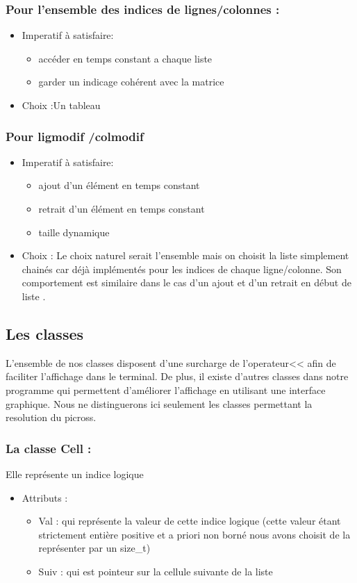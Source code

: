 \documentclass{article}
\begin{document}
\subsubsection{Pour l’ensemble des indices de lignes/colonnes :}
\begin{itemize}
\item Imperatif \`a satisfaire:
\begin{itemize}
\item acc\'eder en temps constant a chaque liste
\item garder un indicage coh\'erent avec la matrice
\end{itemize}
\item Choix :Un tableau
\end{itemize}
\subsubsection{Pour ligmodif /colmodif}
\begin{itemize}
\item Imperatif \`a satisfaire:
\begin{itemize}
\item ajout d’un \'el\'ement en temps constant
\item retrait d’un \'el\'ement en temps constant
\item taille dynamique
\end{itemize}
\item Choix :
Le choix naturel serait l’ensemble mais on choisit la liste simplement chain\'es car d\'ej\`a  impl\'ement\'es pour les indices de chaque ligne/colonne. Son
comportement est similaire dans le cas d'un ajout et d'un retrait en d\'ebut de liste .
\end{itemize}
\subsection{ Les classes}
L'ensemble de nos classes disposent d'une surcharge de l'operateur<< afin de faciliter l'affichage dans le terminal. De plus, il existe d'autres classes dans notre
programme qui permettent d'am\'eliorer l'affichage en utilisant une interface graphique. Nous ne distinguerons ici seulement les classes permettant la
resolution du picross.

\subsubsection{La classe Cell :}
Elle repr\'esente un indice logique
\begin{itemize}
\item Attributs :
\begin{itemize}
\item Val : qui repr\'esente la valeur de cette indice logique (cette valeur \'etant strictement enti\`ere positive et a priori non born\'e nous avons choisit de la repr\'esenter par un size\_t)
\item Suiv : qui est pointeur sur la cellule suivante de la liste
\end{itemize}
\end{itemize}
\end{document}
